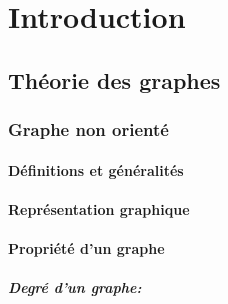 \documentclass[11pt,a4paper]{report}
\theoremstyle{definition}
\begin{document}







\tableofcontents
\newpage

\listoffigures
{}
\cleardoublepage


\listoftables
{}
\cleardoublepage



\part{Introduction} 


	\chapter{ Théorie des graphes}
	
	
	\section{Graphe non orienté}
		\subsection{Définitions et généralités}
		\subsection{Représentation graphique}
		\subsection{Propriété d'un graphe} %
			\subsubsection{Degré d'un graphe:} %
\end{document}
